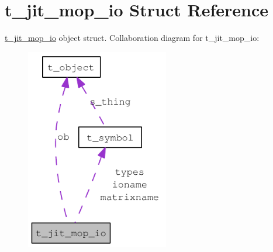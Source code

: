 \hypertarget{structt__jit__mop__io}{
\section{t\_\-jit\_\-mop\_\-io Struct Reference}
\label{structt__jit__mop__io}
}


\hyperlink{structt__jit__mop__io}{t\_\-jit\_\-mop\_\-io} object struct.  
Collaboration diagram for t\_\-jit\_\-mop\_\-io:\nopagebreak
\begin{figure}[H]
\begin{center}
\leavevmode
\includegraphics[width=177pt]{structt__jit__mop__io__coll__graph}
\end{center}
\end{figure}
